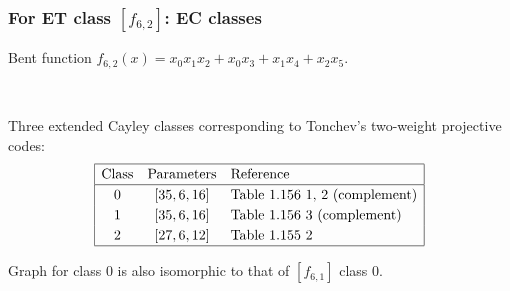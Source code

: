 \documentclass[pdf,sprung,slideColor,nocolorBG]{beamer}
\newenvironment{colortheme}[1]{
\def\ProvidesPackageRCS $##1${\relax}
\renewcommand{\ProcessOptions}{\relax}
\makeatletter

\makeatother
}{}
\begin{document}
\begin{colortheme}{jubata}
\begin{frame}
\begin{figure}
\begin{minipage}{.48\textwidth}
  \label{fig:6_1_bent_cayley_graph_index_matrix}
\end{minipage}
\end{figure}
\end{frame}
\begin{frame}
\frametitle{For ET class $[f_{6,2}]$: EC classes}

Bent function
$f_{6,2}(x) = x_{0} x_{1} x_{2} + x_{0} x_{3} + x_{1} x_{4} + x_{2} x_{5}$.

~

Three extended Cayley classes corresponding to Tonchev's two-weight projective codes:
\begin{align*}
\def\arraystretch{1.2}
\begin{array}{|ccl|}
\hline
\text{Class} &
\text{Parameters} & \text{Reference}
\\
\hline
0 & [35,6,16] & \text{Table 1.156 1, 2 (complement)}
\\
1 & [35,6,16] & \text{Table 1.156 3 (complement)}
\\
2 & [27,6,12] & \text{Table 1.155 2 }
\\
\hline
\end{array}
\end{align*}

Graph for class 0 is also isomorphic to that of $[f_{6,1}]$ class 0.


\end{frame}
\end{colortheme}
\end{document}
